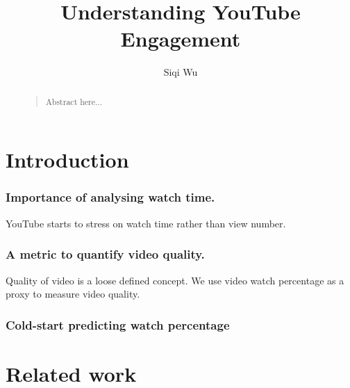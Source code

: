 \documentclass[letterpaper]{article}
\begin{document}

\title{Understanding YouTube Engagement}
\author{Siqi Wu\\
}

\maketitle

\begin{abstract}
\begin{quote}
Abstract here...
\end{quote}
\end{abstract}


\section{Introduction}
\subsubsection{Importance of analysing watch time.} YouTube starts to stress on watch time rather than view number.

\subsubsection{A metric to quantify video quality.} Quality of video is a loose defined concept. We use video watch percentage as a proxy to measure video quality.

\subsubsection{Cold-start predicting watch percentage}


\section{Related work}
\end{document}

